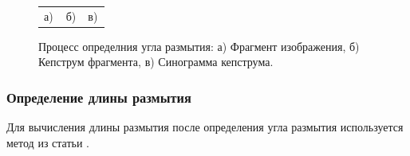 \begin{figure}[H]
\begin{minipage}[h]{0.32\linewidth}
\end{minipage}
\hfill
\begin{minipage}[h]{0.32\linewidth}
\end{minipage}
\begin{minipage}[h]{1\linewidth}
\begin{tabular}{p{0.32\linewidth}p{0.32\linewidth}p{0.32\linewidth}}
\centering а) & \centering б) & \centering в) \\
\end{tabular}
\end{minipage}
\vspace*{-1cm}
\caption{Процесс определния угла размытия: а) Фрагмент изображения, б) Кепструм фрагмента, в) Синограмма кепструма.}
\label{ris:correlationsignals}
\end{figure}

\subsubsection{Определение длины размытия}
Для вычисления длины размытия после определения угла размытия используется метод из статьи \cite{novel}.

